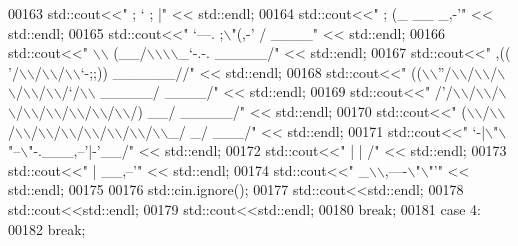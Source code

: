 \begin{DoxyCode}
00163 std::cout<<\textcolor{stringliteral}{"               ;     `        ;      |"}         << std::endl;
00164 std::cout<<\textcolor{stringliteral}{"                ;      (\_   \_\_   \_,-'"}         << std::endl;
00165 std::cout<<\textcolor{stringliteral}{"                 `---.   ;\(\backslash\)"(,-' /                              \_\_\_\_"}         << std::endl;
00166 std::cout<<\textcolor{stringliteral}{"                      \(\backslash\)\(\backslash\) (\_\_/\(\backslash\)\(\backslash\)\(\backslash\)\(\backslash\)\_`-.-.                     \_\_\_\_\_/"}         << std::endl;
00167 std::cout<<\textcolor{stringliteral}{"                    ,(( '/\(\backslash\)\(\backslash\)/\(\backslash\)\(\backslash\)/\(\backslash\)\(\backslash\)`-;;))             \_\_\_\_\_\_//"}         << std::endl;
00168 std::cout<<\textcolor{stringliteral}{"                   ((\(\backslash\)\(\backslash\)''/\(\backslash\)\(\backslash\)/\(\backslash\)\(\backslash\)/\(\backslash\)\(\backslash\)/\(\backslash\)\(\backslash\)/\(\backslash\)\(\backslash\)/`/\(\backslash\)\(\backslash\)      \_\_\_\_\_/  \_\_\_\_/"}         << std::endl;
00169 std::cout<<\textcolor{stringliteral}{"                   /'/\(\backslash\)\(\backslash\)/\(\backslash\)\(\backslash\)/\(\backslash\)\(\backslash\)/\(\backslash\)\(\backslash\)/\(\backslash\)\(\backslash\)/\(\backslash\)\(\backslash\)/\(\backslash\)\(\backslash\)/\(\backslash\)\(\backslash\)/)  \_\_/  \_\_\_\_\_/"}         << std::endl;
00170 std::cout<<\textcolor{stringliteral}{"                  (\(\backslash\)\(\backslash\)/\(\backslash\)\(\backslash\)/\(\backslash\)\(\backslash\)/\(\backslash\)\(\backslash\)/\(\backslash\)\(\backslash\)/\(\backslash\)\(\backslash\)/\(\backslash\)\(\backslash\)/\(\backslash\)\(\backslash\)/\(\backslash\)\(\backslash\)\_/ \_/ \_\_\_/"}         << std::endl;
00171 std::cout<<\textcolor{stringliteral}{"                   `-|\(\backslash\)"\(\backslash\)"--\(\backslash\)"-.\_\_\_,--'|-'\_\_/"}         << std::endl;
00172 std::cout<<\textcolor{stringliteral}{"                     |              | /"}         << std::endl;
00173 std::cout<<\textcolor{stringliteral}{"                     |         \_\_,--'"}         << std::endl;
00174 std::cout<<\textcolor{stringliteral}{"                     \_\(\backslash\)\(\backslash\),----\(\backslash\)"\(\backslash\)"'"}         << std::endl;
00175 
00176 std::cin.ignore();
00177 std::cout<<std::endl;
00178 std::cout<<std::endl;
00179 std::cout<<std::endl;
00180              \textcolor{keywordflow}{break};
00181         \textcolor{keywordflow}{case} 4:
00182              \textcolor{keywordflow}{break};

\end{DoxyCode}
